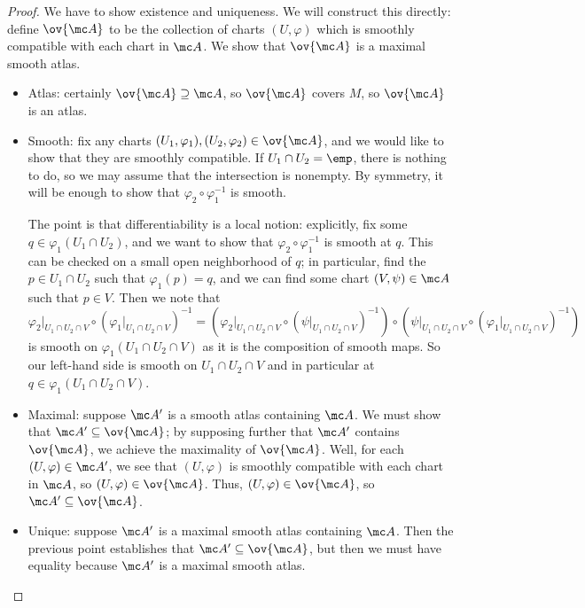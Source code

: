 \documentclass[../notes.tex]{subfiles}
\begin{document}
\begin{proof}
	We have to show existence and uniqueness. We will construct this directly: define $\ov{\mc A}$ to be the collection of charts $(U,\varphi)$ which is smoothly compatible with each chart in $\mc A$. We show that $\ov{\mc A}$ is a maximal smooth atlas.
	\begin{itemize}
		\item Atlas: certainly $\ov{\mc A}\supseteq\mc A$, so $\ov{\mc A}$ covers $M$, so $\ov{\mc A}$ is an atlas.

		\item Smooth: fix any charts $(U_1,\varphi_1),(U_2,\varphi_2)\in\ov{\mc A}$, and we would like to show that they are smoothly compatible. If $U_1\cap U_2=\emp$, there is nothing to do, so we may assume that the intersection is nonempty. By symmetry, it will be enough to show that $\varphi_2\circ\varphi_1^{-1}$ is smooth.
		
		The point is that differentiability is a local notion: explicitly, fix some $q\in\varphi_1(U_1\cap U_2)$, and we want to show that $\varphi_2\circ\varphi_1^{-1}$ is smooth at $q$. This can be checked on a small open neighborhood of $q$; in particular, find the $p\in U_1\cap U_2$ such that $\varphi_1(p)=q$, and we can find some chart $(V,\psi)\in\mc A$ such that $p\in V$. Then we note that
		\[\varphi_2|_{U_1\cap U_2\cap V}\circ(\varphi_1|_{U_1\cap U_2\cap V})^{-1}=\left(\varphi_2|_{U_1\cap U_2\cap V}\circ(\psi|_{U_1\cap U_2\cap V})^{-1}\right)\circ\left(\psi|_{U_1\cap U_2\cap V}\circ(\varphi_1|_{U_1\cap U_2\cap V})^{-1}\right)\]
		is smooth on $\varphi_1(U_1\cap U_2\cap V)$ as it is the composition of smooth maps. So our left-hand side is smooth on $U_1\cap U_2\cap V$ and in particular at $q\in\varphi_1(U_1\cap U_2\cap V)$.

		\item Maximal: suppose $\mc A'$ is a smooth atlas containing $\mc A$. We must show that $\mc A'\subseteq\ov{\mc A}$; by supposing further that $\mc A'$ contains $\ov{\mc A}$, we achieve the maximality of $\ov{\mc A}$. Well, for each $(U,\varphi)\in\mc A'$, we see that $(U,\varphi)$ is smoothly compatible with each chart in $\mc A$, so $(U,\varphi)\in\ov{\mc A}$. Thus, $(U,\varphi)\in\ov{\mc A}$, so $\mc A'\subseteq\ov{\mc A}$.

		\item Unique: suppose $\mc A'$ is a maximal smooth atlas containing $\mc A$. Then the previous point establishes that $\mc A'\subseteq\ov{\mc A}$, but then we must have equality because $\mc A'$ is a maximal smooth atlas.
		\qedhere
	\end{itemize}
\end{proof}
\end{document}

